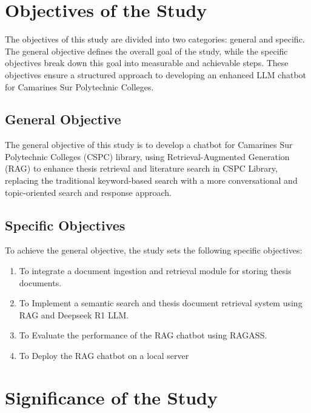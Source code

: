 \begin{refsection}
\section{Objectives of the Study}
\hspace{0.4cm}The objectives of this study are divided into two categories: general and specific. The general objective defines the overall goal of the study, while the specific objectives break down this goal into measurable and achievable steps. These objectives ensure a structured approach to developing an enhanced LLM chatbot for Camarines Sur Polytechnic Colleges. 

\subsection{General Objective}
The general objective of this study is to develop a chatbot for  Camarines Sur Polytechnic Colleges (CSPC) library, using Retrieval-Augmented Generation (RAG) to enhance thesis retrieval and literature search in CSPC Library, replacing the traditional keyword-based search with a more conversational and topic-oriented search and response approach.

\subsection{Specific Objectives}
To achieve the general objective, the study sets the following specific objectives:
\begin{enumerate}
    \item To integrate a document ingestion and retrieval module for storing thesis documents.
    \item To Implement a semantic search and thesis document retrieval system using RAG and Deepseek R1 LLM.
    \item To Evaluate the performance of the RAG chatbot using RAGASS.
    \item To Deploy the RAG chatbot on a local server
\end{enumerate}

   
\clearpage
\section{Significance of the Study}


\end{refsection}
